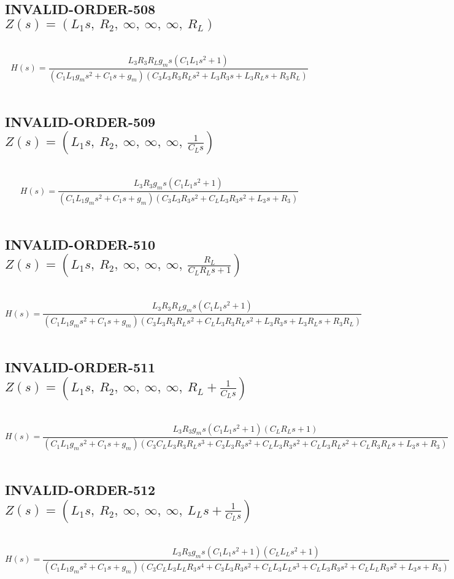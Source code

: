 \documentclass{article}
\begin{document}
\subsection{INVALID-ORDER-508 $Z(s) = \left( L_{1} s, \  R_{2}, \  \infty, \  \infty, \  \infty, \  R_{L}\right)$ } \ 
\textbf{\[H(s) = \frac{L_{3} R_{3} R_{L} g_{m} s \left(C_{1} L_{1} s^{2} + 1\right)}{\left(C_{1} L_{1} g_{m} s^{2} + C_{1} s + g_{m}\right) \left(C_{3} L_{3} R_{3} R_{L} s^{2} + L_{3} R_{3} s + L_{3} R_{L} s + R_{3} R_{L}\right)}\] } \ 
\subsection{INVALID-ORDER-509 $Z(s) = \left( L_{1} s, \  R_{2}, \  \infty, \  \infty, \  \infty, \  \frac{1}{C_{L} s}\right)$ } \ 
\textbf{\[H(s) = \frac{L_{3} R_{3} g_{m} s \left(C_{1} L_{1} s^{2} + 1\right)}{\left(C_{1} L_{1} g_{m} s^{2} + C_{1} s + g_{m}\right) \left(C_{3} L_{3} R_{3} s^{2} + C_{L} L_{3} R_{3} s^{2} + L_{3} s + R_{3}\right)}\] } \ 
\subsection{INVALID-ORDER-510 $Z(s) = \left( L_{1} s, \  R_{2}, \  \infty, \  \infty, \  \infty, \  \frac{R_{L}}{C_{L} R_{L} s + 1}\right)$ } \ 
\textbf{\[H(s) = \frac{L_{3} R_{3} R_{L} g_{m} s \left(C_{1} L_{1} s^{2} + 1\right)}{\left(C_{1} L_{1} g_{m} s^{2} + C_{1} s + g_{m}\right) \left(C_{3} L_{3} R_{3} R_{L} s^{2} + C_{L} L_{3} R_{3} R_{L} s^{2} + L_{3} R_{3} s + L_{3} R_{L} s + R_{3} R_{L}\right)}\] } \ 
\subsection{INVALID-ORDER-511 $Z(s) = \left( L_{1} s, \  R_{2}, \  \infty, \  \infty, \  \infty, \  R_{L} + \frac{1}{C_{L} s}\right)$ } \ 
\textbf{\[H(s) = \frac{L_{3} R_{3} g_{m} s \left(C_{1} L_{1} s^{2} + 1\right) \left(C_{L} R_{L} s + 1\right)}{\left(C_{1} L_{1} g_{m} s^{2} + C_{1} s + g_{m}\right) \left(C_{3} C_{L} L_{3} R_{3} R_{L} s^{3} + C_{3} L_{3} R_{3} s^{2} + C_{L} L_{3} R_{3} s^{2} + C_{L} L_{3} R_{L} s^{2} + C_{L} R_{3} R_{L} s + L_{3} s + R_{3}\right)}\] } \ 
\subsection{INVALID-ORDER-512 $Z(s) = \left( L_{1} s, \  R_{2}, \  \infty, \  \infty, \  \infty, \  L_{L} s + \frac{1}{C_{L} s}\right)$ } \ 
\textbf{\[H(s) = \frac{L_{3} R_{3} g_{m} s \left(C_{1} L_{1} s^{2} + 1\right) \left(C_{L} L_{L} s^{2} + 1\right)}{\left(C_{1} L_{1} g_{m} s^{2} + C_{1} s + g_{m}\right) \left(C_{3} C_{L} L_{3} L_{L} R_{3} s^{4} + C_{3} L_{3} R_{3} s^{2} + C_{L} L_{3} L_{L} s^{3} + C_{L} L_{3} R_{3} s^{2} + C_{L} L_{L} R_{3} s^{2} + L_{3} s + R_{3}\right)}\] } \ 
\end{document}

